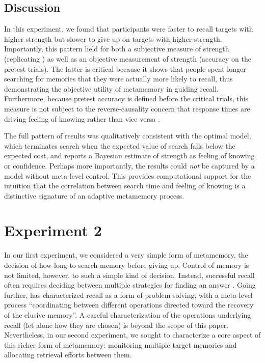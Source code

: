 \subsection{Discussion}

In this experiment, we found that participants were faster to recall targets with higher strength but slower to give up on targets with higher strength. Importantly, this pattern held for both a subjective measure of strength (replicating \citealp{costermans1992confidence}) as well as an objective measurement of strength (accuracy on the pretest trials). The latter is critical because it shows that people spent longer searching for memories that they were actually more likely to recall, thus demonstrating the objective utility of metamemory in guiding recall. Furthermore, because pretest accuracy is defined before the critical trials, this measure is not subject to the reverse-causality concern that response times are driving feeling of knowing rather than vice versa \citep{schwartz2001relation}. 

The full pattern of results was qualitatively consistent with the optimal model, which terminates search when the expected value of search falls below the expected cost, and reports a Bayesian estimate of strength as feeling of knowing or confidence. Perhaps more importantly, the results could \emph{not} be captured by a model without meta-level control. This provides computational support for the intuition that the correlation between search time and feeling of knowing is a distinctive signature of an adaptive metamemory process.

\section{Experiment 2}

In our first experiment, we considered a very simple form of metamemory, the decision of how long to search memory before giving up. Control of memory is not limited, however, to such a simple kind of decision. Instead, successful recall often requires deciding between multiple strategies for finding an answer \citep{reder1988strategic}. Going further, \citep{koriat2000control} has characterized recall as a form of problem solving, with a meta-level process ``coordinating between different operations directed toward the recovery of the elusive memory''. A careful characterization of the operations underlying recall (let alone how they are chosen) is beyond the scope of this paper. Nevertheless, in our second experiment, we sought to characterize a core aspect of this richer form of metamemory: monitoring multiple target memories and allocating retrieval efforts between them. 

